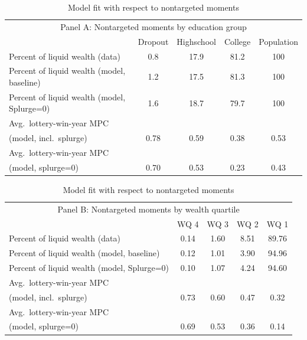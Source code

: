 \documentclass[\latexroot/\projectname]{subfiles}
\begin{document}
\begin{table}[tb] 
  \caption{\pregenmark Model fit with respect to nontargeted moments}
  \whenintegrated{\label{tab:nonTargetedMoments-wSplZero}} %
  \centering

  \begin{tabular*}
    {\textwidth}{@{\extracolsep{\fill}}lcccc@{}}
    \multicolumn{5}{c}{\small Panel A: Nontargeted moments by education group} \\
    \addlinespace
    \hline
    & Dropout & Highschool & College & Population \\ \hline
    Percent of liquid wealth (data)             & 0.8  & 17.9 & 81.2 & 100 \\
    Percent of liquid wealth (model, baseline)  & 1.2  & 17.5 & 81.3 & 100 \\
    Percent of liquid wealth (model, Splurge=0) & 1.6  & 18.7 & 79.7 & 100 \\
    \addlinespace
    Avg.\ lottery-win-year MPC \\ \quad (model, incl.\ splurge) & 0.78 & 0.59 & 0.38 & 0.53 \\
    Avg.\ lottery-win-year MPC \\ \quad (model, splurge=0)     & 0.70 & 0.53 & 0.23 & 0.43 \\
    \hline
  \end{tabular*}

  \vspace{0.5em}

  \begin{tabular*}
    {\textwidth}{@{\extracolsep{\fill}}lcccc@{}}
    \multicolumn{5}{c}{\small Panel B: Nontargeted moments by wealth quartile} \\
    \addlinespace
    \hline
    & WQ 4 & WQ 3 & WQ 2 & WQ 1 \\ \hline
    Percent of liquid wealth (data)             & 0.14 & 1.60 & 8.51 & 89.76 \\
    Percent of liquid wealth (model, baseline)  & 0.12 & 1.01 & 3.90 & 94.96 \\
    Percent of liquid wealth (model, Splurge=0) & 0.10 & 1.07 & 4.24 & 94.60 \\
    \addlinespace
    Avg.\ lottery-win-year MPC \\ \quad (model, incl.\ splurge) & 0.73 & 0.60 & 0.47 & 0.32 \\
    Avg.\ lottery-win-year MPC \\ \quad (model, splurge=0)     & 0.69 & 0.53 & 0.36 & 0.14 \\
    \hline
  \end{tabular*}


\end{table}
\end{document}
